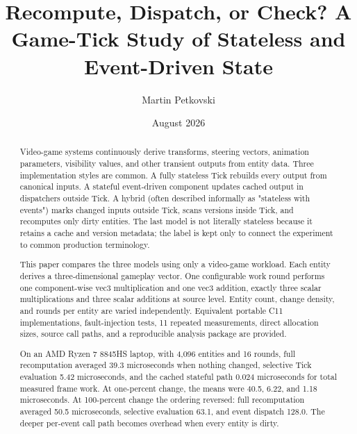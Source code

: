 \title{Recompute, Dispatch, or Check? A Game-Tick Study of Stateless and Event-Driven State}
\author{Martin Petkovski}
\date{August 2026}


\maketitle

\begin{abstract}
Video-game systems continuously derive transforms, steering vectors, animation parameters, visibility values, and other transient outputs from entity data. Three implementation styles are common. A fully stateless Tick rebuilds every output from canonical inputs. A stateful event-driven component updates cached output in dispatchers outside Tick. A hybrid (often described informally as "stateless with events") marks changed inputs outside Tick, scans versions inside Tick, and recomputes only dirty entities. The last model is not literally stateless because it retains a cache and version metadata; the label is kept only to connect the experiment to common production terminology.

This paper compares the three models using only a video-game workload. Each entity derives a three-dimensional gameplay vector. One configurable work round performs one component-wise vec3 multiplication and one vec3 addition, exactly three scalar multiplications and three scalar additions at source level. Entity count, change density, and rounds per entity are varied independently. Equivalent portable C11 implementations, fault-injection tests, 11 repeated measurements, direct allocation sizes, source call paths, and a reproducible analysis package are provided.

On an AMD Ryzen 7 8845HS laptop, with 4,096 entities and 16 rounds, full recomputation averaged 39.3 microseconds when nothing changed, selective Tick evaluation 5.42 microseconds, and the cached stateful path 0.024 microseconds for total measured frame work. At one-percent change, the means were 40.5, 6.22, and 1.18 microseconds. At 100-percent change the ordering reversed: full recomputation averaged 50.5 microseconds, selective evaluation 63.1, and event dispatch 128.0. The deeper per-event call path becomes overhead when every entity is dirty.


\end{abstract}
